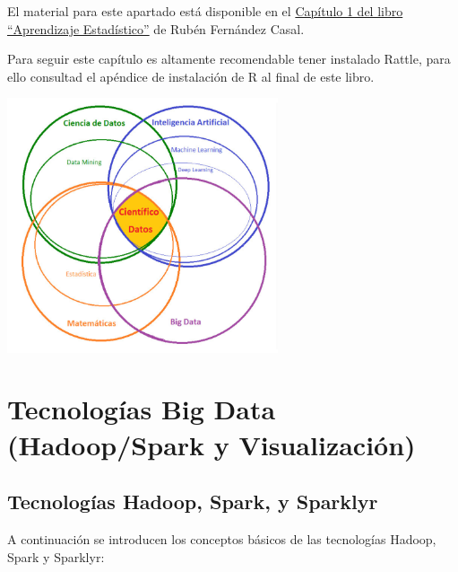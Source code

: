 \documentclass[
]{book}
\begin{document}
El material para este apartado está disponible en el
\href{https://rubenfcasal.github.io/aprendizaje_estadistico/intro-AE.html}{Capítulo 1 del libro ``Aprendizaje Estadístico''} de Rubén Fernández Casal.

Para seguir este capítulo es altamente recomendable tener instalado Rattle, para ello consultad el apéndice de instalación de R al final de este libro.

\includegraphics[width=0.6\textwidth,height=\textheight]{images/T3-CientificoDatos.png}

\hypertarget{tecnologuxedas-big-data-hadoopspark-y-visualizaciuxf3n}{%
\section{Tecnologías Big Data (Hadoop/Spark y Visualización)}\label{tecnologuxedas-big-data-hadoopspark-y-visualizaciuxf3n}}

\hypertarget{tecnologuxedas-hadoop-spark-y-sparklyr}{%
\subsection{Tecnologías Hadoop, Spark, y Sparklyr}\label{tecnologuxedas-hadoop-spark-y-sparklyr}}

A continuación se introducen los conceptos básicos de las tecnologías Hadoop, Spark y Sparklyr:
\end{document}
